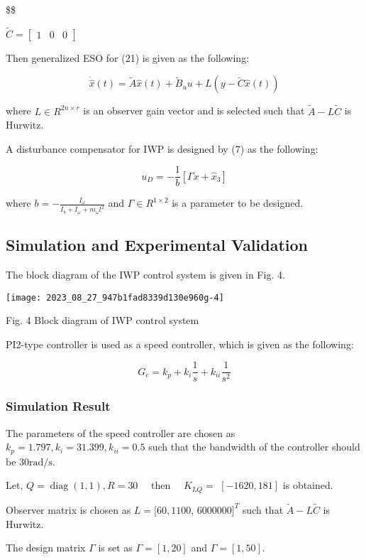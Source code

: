 \documentclass[10pt]{article}
\begin{document}
\$\$

$\tilde{C}=\left[\begin{array}{lll}1 & 0 & 0\end{array}\right]$

Then generalized ESO for (21) is given as the following:

$$
\dot{\hat{x}}(t)=\tilde{A} \hat{x}(t)+\tilde{B}_{u} u+L(y-\tilde{C} \hat{x}(t))
$$

where $L \in R^{2 n \times r}$ is an observer gain vector and is selected such that $\tilde{A}-L \tilde{C}$ is Hurwitz.

A disturbance compensator for IWP is designed by (7) as the following:

$$
u_{D}=-\frac{1}{b}\left[\Gamma x+\hat{x}_{3}\right]
$$

where $b=-\frac{I_{\omega}}{I_{b}+I_{\omega}+m_{\omega} l^{2}}$ and $\Gamma \in R^{1 \times 2}$ is a parameter to be designed.

\subsection{Simulation and Experimental Validation}
The block diagram of the IWP control system is given in Fig. 4.

\begin{center}
\texttt{[image: 2023\_08\_27\_947b1fad8339d130e960g-4]}
\end{center}

Fig. 4 Block diagram of IWP control system

PI2-type controller is used as a speed controller, which is given as the following:

$$
G_{c}=k_{p}+k_{i} \frac{1}{s}+k_{i i} \frac{1}{s^{2}}
$$

\subsubsection{Simulation Result}
The parameters of the speed controller are chosen as $k_{p}=1.797, k_{i}=31.399, k_{i i}=0.5$ such that the bandwidth of the controller should be $30 \mathrm{rad} / \mathrm{s}$.

Let, $Q=\operatorname{diag}(1,1), R=30 \quad$ then $\quad K_{L Q}=$ $[-1620,181]$ is obtained.

Observer matrix is chosen as $L=[60,1100$, $6000000]^{T}$ such that $\tilde{A}-L \tilde{C}$ is Hurwitz.

The design matrix $\Gamma$ is set as $\Gamma=[1,20]$ and $\Gamma=[1,50]$.
\end{document}
